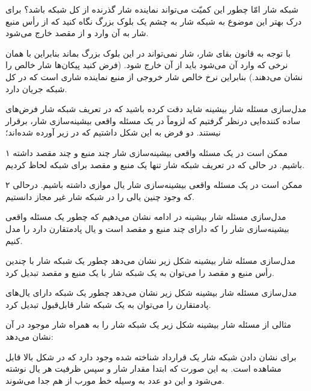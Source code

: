 \begin{itemframe}{شبکه شار}
\itm
امّا چطور این کمیّت می‌تواند نماینده شار گذرنده از کل شبکه باشد؟
\itm
برای درک بهتر این موضوع به شبکه شار به چشم یک بلوک بزرگ نگاه کنید که از رأس منبع شار به آن وارد و از مقصد خارج می‌شود.

\itm
با توجه به قانون بقای شار، شار نمی‌تواند در این بلوک بزرگ بماند بنابراین با همان نرخی که وارد آن می‌شود باید از آن خارج شود. (فرض کنید پیکان‌ها شار خالص را نشان می‌دهند.)‌
\itm
بنابراین نرخ خالص شار خروجی از منبع نماینده شاری است که در کل شبکه جریان دارد.
\end{itemframe}



\begin{itemframe}{مدل‌سازی مسئله شار بیشینه}
\itm
شاید دقت کرده باشید که در تعریف شبکه شار فرض‌های ساده کننده‌ایی درنظر گرفتیم که لزوماً در یک مسئله واقعی بیشینه‌سازی شار، برقرار نیستند. دو فرض به این شکل داشتیم که در زیر آورده شده‌اند؛
\item[۱]
ممکن است در یک مسئله واقعی بیشینه‌سازی شار چند منبع و چند مقصد داشته باشیم. در حالی که در تعریف شبکه شار تنها یک منبع و مقصد برای شبکه لحاظ کردیم.
\item[۲]
ممکن است در یک مسئله واقعی بیشینه‌سازی شار یال موازی داشته باشیم. درحالی که وجود چنین یالی را در شبکه شار غیر مجاز دانستیم.
\end{itemframe}


\begin{itemframe}{مدل‌سازی مسئله شار بیشینه}
\itm
در ادامه نشان می‌دهیم که چطور یک مسئله واقعی بیشینه‌سازی شار را که دارای چند منبع و مقصد است و یال پادمتقارن دارد را مدل کنیم.

\end{itemframe}


\begin{itemframe}{مدل‌سازی مسئله شار بیشینه}
\itm
شکل زیر نشان می‌دهد چطور یک شبکه شار با چندین رأس منبع و مقصد را می‌توان به یک شبکه شار با یک منبع و مقصد تبدیل کرد.

\end{itemframe}


\begin{itemframe}{مدل‌سازی مسئله شار بیشینه}
\itm
شکل زیر نشان می‌دهد چطور یک شبکه دارای یال‌های پادمتقارن را می‌توان به یک شبکه شار قابل‌قبول تبدیل کرد.
\end{itemframe}

\begin{itemframe}{مثالی از مسئله شار بیشینه}
\itm
شکل زیر یک شبکه شار را به همراه شار موجود در آن نشان می‌دهد:

\itm
برای نشان دادن شبکه شار یک قرارداد شناخته شده وجود دارد که در شکل بالا قابل مشاهده است. به این صورت که ابتدا مقدار شار و سپس ظرفیت هر یال نوشته می‌شود و این دو عدد به وسیله خط مورب از هم جدا می‌شوند.
\end{itemframe}


